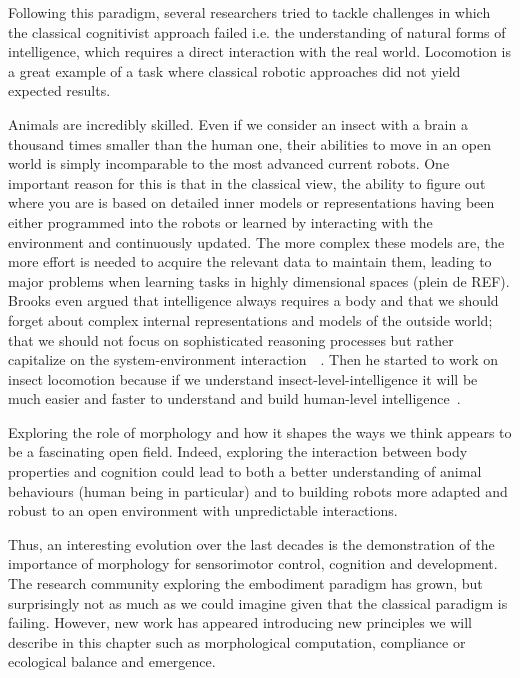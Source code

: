 Following this paradigm, several researchers tried to tackle challenges in which the classical cognitivist approach failed i.e. the understanding of natural forms of intelligence, which requires a direct interaction with the real world. Locomotion is a great example of a task where classical robotic approaches did not yield expected results.

Animals are incredibly skilled. Even if we consider an insect with a brain a thousand times smaller than the human one, their abilities to move in an open world is simply incomparable to the most advanced current robots. One important reason for this is that in the classical view, the ability to figure out where you are is based on detailed inner models or representations having been either programmed into the robots or learned by interacting with the environment and continuously updated. The more complex these models are, the more effort is needed to acquire the relevant data to maintain them, leading to major problems when learning tasks in highly dimensional spaces (plein de REF). Brooks even argued that intelligence always requires a body and that we should forget about complex internal representations and models of the outside world; that we should not focus on sophisticated reasoning processes but rather capitalize on the system-environment interaction~\cite{brooks1991intelligence}~\cite{brooks1995intelligence}. Then he started to work on insect locomotion because if we understand insect-level-intelligence it will be much easier and faster to understand and build human-level intelligence~\cite{brooks1996prospects}.


Exploring the role of morphology and how it shapes the ways we think appears to be a fascinating open field. Indeed, exploring the interaction between body properties and cognition could lead to both a better understanding of animal behaviours (human being in particular) and to building robots more adapted and robust to an open environment with unpredictable interactions.

Thus, an interesting evolution over the last decades is the demonstration of the importance of morphology for sensorimotor control, cognition and development. The research community exploring the embodiment paradigm has grown, but surprisingly not as much as we could imagine given that the classical paradigm is failing. However, new work has appeared introducing new principles we will describe in this chapter such as morphological computation, compliance or ecological balance and emergence.

